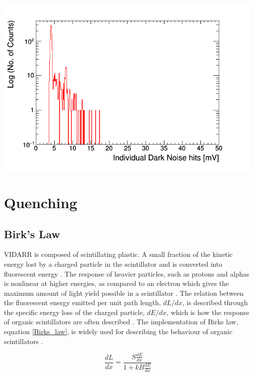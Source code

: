 \documentclass[12pt,a4paper]{article}
\newenvironment{Figure}
  {\par\medskip\noindent\minipage{\linewidth}}
  {\endminipage\par\medskip}
\begin{document}
\begin{Figure}
 \centering
 \includegraphics[height=90mm]{DarkNois_10E6_15kHz.png}
 \label{dark_noise_10E6_15Hz}
\end{Figure}


\section{Quenching}
\subsection{Birk's Law}
VIDARR is composed of scintillating plastic. A small fraction of the kinetic energy lost by a charged particle in the scintillator and is converted into fluorescent energy \cite{rad_det_and_meas}. The response of heavier particles, such as protons and alphas is nonlinear at higher energies, as compared to an electron which gives the maximum amount of light yield possible in a scintillator \cite{rad_det_and_meas}. The relation between the fluorescent energy emitted per unit path length, $dL/dx$, is described through the specific energy loss of the charged particle, $dE/dx$, which is how the response of organic scintillators are often described \cite{rad_det_and_meas}. The implementation of Birks law, equation \ref{Birks_law}, is widely used for describing the behaviour of organic scintillators \cite{rad_det_and_meas} \cite{birks_book}.

\begin{equation}
\frac{dL}{dx} = \frac{S\frac{dE}{dx}}{1 + kB \frac{dE}{dx}}
\label{Birks_law}
\end{equation}
\end{document}
